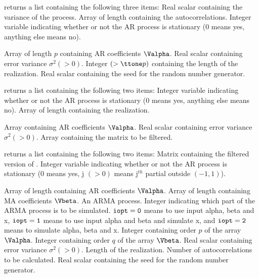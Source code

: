 \Sval
\Sitem{ }  returns a list containing the following 
three items:
 Real scalar containing the variance of the process.
 Array of length {} containing the 
autocorrelations.
 Integer variable indicating whether or not the AR 
process is stationary (0 means yes, anything else means no).
%
%


\Sarg
{} Array of length $p$ containing AR coefficients 
$\Valpha$.
 Real scalar containing error variance $\sigma^2(>0)$.
 Integer $(>{\tsl{p}})$ containing the length of the
realization.
 Real scalar containing the seed for the random
number generator.

\Sval
\Sitem{ }  returns a list containing the following 
two items:
 Integer variable indicating whether or not the AR
process is stationary (0 means yes, anything else means no).
 Array of length {} containing the realization.
%
%


\Sarg
{} Array containing AR coefficients $\Valpha$.
 Real scalar containing error variance $\sigma^2(>0)$.
 Array containing the matrix to be filtered.

\Sval
\Sitem{ }  returns a list containing the following 
two items:
 Matrix containing the filtered version of {}.
 Integer variable indicating whether or not the AR
process is stationary (0 means yes, j $(>0)$ means j$^{th}$ 
partial outside $(-1,1)$).
%
%


\Sarg
{} Array of length {} containing AR coefficients 
$\Valpha$.
 Array of length {} containing MA coefficients 
$\Vbeta$.
 An ARMA process.
 Integer indicating which part of the ARMA
process is to be simulated.  ${\tt{iopt}=0}$ means to use input
alpha, beta and x,  ${\tt{iopt}=1}$ means to use input alpha
and beta and simulate x, and ${\tt{iopt}=2}$ means to simulate
alpha, beta and x.
 Integer containing order $p$ of the array $\Valpha$.
 Integer containing order $q$ of the array $\Vbeta$.
 Real scalar containing error variance $\sigma^2(>0)$.
 Length of the realization.
 Number of autocorrelations to be calculated.
 Real scalar containing the seed for the random
number generator.

